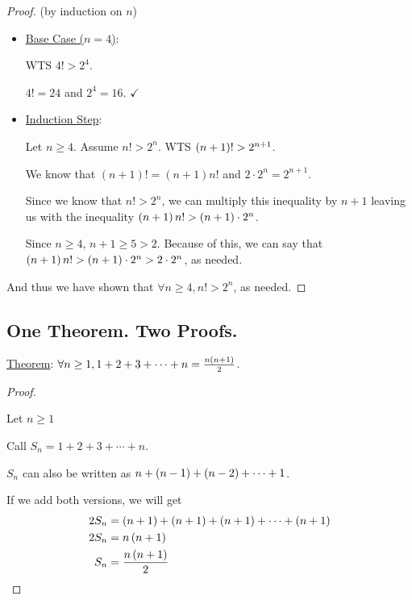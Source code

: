 \begin{proof} (by induction on \(n\)) \(\)

  \begin{itemize}

    \item \underline{Base Case (\(n = 4\))}:

          WTS \(4! > 2^4\).

          \(4! = 24\) and \(2^{4} = 16\). \(\checkmark\)

    \item  \underline{Induction Step}:

          Let \(n \geq 4\). Assume \(n! > 2^{n}\). WTS \(\left(n + 1\right)! > 2^{n + 1}\).

          We know that \((n + 1)! = (n + 1) n! \)  and \(2 \cdot 2^{n} = 2^{n + 1}\).

          Since we know that \(n! > 2^{n}\), we can multiply this inequality by \(n + 1\) leaving us with the inequality \(\left(n + 1\right) n! > \left(n + 1\right) \cdot 2^{n}\).

          Since \(n \geq 4\), \(n + 1 \geq 5 > 2\). Because of this, we can say that \(\left(n + 1\right) n! > \left(n + 1\right) \cdot 2^{n} > 2 \cdot 2^{n}\), as needed.
  \end{itemize}
  And thus we have shown that \(\forall n \geq 4, n! > 2^{n}\), as needed. \qedhere

\end{proof}

\subsection{One Theorem. Two Proofs.}

\underline{Theorem}: \(\forall n \geq 1, 1 + 2 + 3 + \cdots + n = \frac{n \left(n + 1\right)}{2}\).

\begin{proof} \(\)

  Let \(n \geq 1\)

  Call \(S_{n} = 1 + 2 + 3 + \cdots + n\).

  \(S_{n}\) can also be written as \(n + \left(n - 1\right) + \left(n - 2\right) + \cdots + 1\).

  If we add both versions, we will get
  \begin{align*}
    2S_{n} &= \left(n + 1\right) + \left(n + 1\right) + \left(n + 1\right) + \cdots + \left(n + 1\right) \\
    2S_{n} &= n \left(n + 1\right) \\
    S_{n} &= \frac{n \left(n + 1\right)}{2} \qedhere
  \end{align*}
\end{proof}

